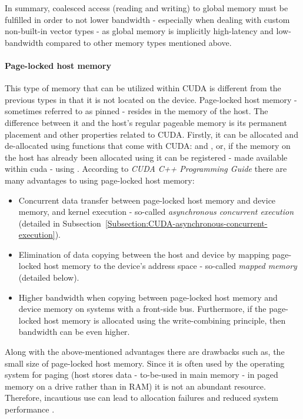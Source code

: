 In summary, coalesced access (reading and writing) to global memory must be fulfilled in order to not lower bandwidth - especially when dealing with custom non-built-in vector types - as global memory is implicitly high-latency and low-bandwidth compared to other memory types mentioned above.

\paragraph{Page-locked host memory}\label{Paragraph:CUDA-memory-management-page-locked-host-memory}
This type of memory that can be utilized within CUDA is different from the previous types in that it is not located on the device. Page-locked host memory - sometimes referred to as pinned - resides in the memory of the host. The difference between it and the host's regular pageable memory is its permanent placement and other properties related to CUDA. Firstly, it can be allocated and de-allocated using functions that come with CUDA:  and , or, if the memory on the host has already been allocated using  it can be registered - made available within cuda - using . According to \emph{CUDA C++ Programming Guide} \cite{NVIDIAMay2022} there are many advantages to using page-locked host memory:

\begin{itemize}
	\item Concurrent data transfer between page-locked host memory and device memory, and kernel execution - so-called \textit{asynchronous concurrent execution} (detailed in Subsection~\ref{Subsection:CUDA-asynchronous-concurrent-execution}).
	\item Elimination of data copying between the host and device by mapping page-locked host memory to the device's address space - so-called \textit{mapped memory} (detailed below).
	\item Higher bandwidth when copying between page-locked host memory and device memory on systems with a front-side bus. Furthermore, if the page-locked host memory is allocated using the write-combining principle, then bandwidth can be even higher.
\end{itemize}

Along with the above-mentioned advantages there are drawbacks such as, the small size of page-locked host memory. Since it is often used by the operating system for paging (host stores data - to-be-used in main memory - in paged memory on a drive rather than in RAM) it is not an abundant resource. Therefore, incautious use can lead to allocation failures and reduced system performance \cite{NVIDIAMay2022}.


